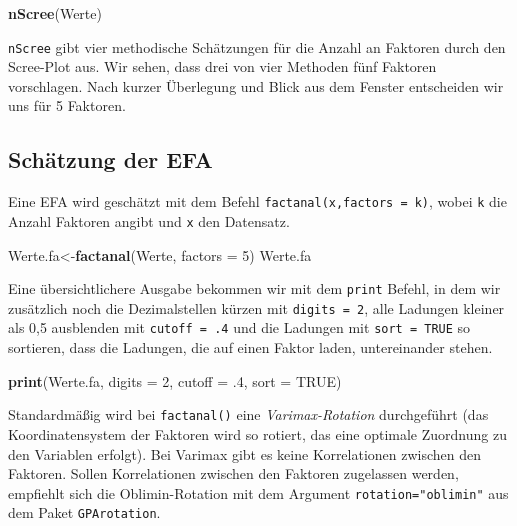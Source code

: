 \documentclass[12pt,ngerman,]{book}
\makeatletter
\newenvironment{Shaded}{\begin{snugshade}}{\end{snugshade}}
\newcommand{\KeywordTok}[1]{\textcolor[rgb]{0.13,0.29,0.53}{\textbf{#1}}}
\newcommand{\DataTypeTok}[1]{\textcolor[rgb]{0.13,0.29,0.53}{#1}}
\newcommand{\DecValTok}[1]{\textcolor[rgb]{0.00,0.00,0.81}{#1}}
\newcommand{\OtherTok}[1]{\textcolor[rgb]{0.56,0.35,0.01}{#1}}
\newcommand{\NormalTok}[1]{#1}
\newenvironment{kframe}{%
\medskip{}
\setlength{\fboxsep}{.8em}
 \def\at@end@of@kframe{}%
 \ifinner\ifhmode%
  \def\at@end@of@kframe{\end{minipage}}%
  \begin{minipage}{\columnwidth}%
 \fi\fi%
 \def\FrameCommand##1{\hskip\@totalleftmargin \hskip-\fboxsep
 \colorbox{shadecolor}{##1}\hskip-\fboxsep
     \hskip-\linewidth \hskip-\@totalleftmargin \hskip\columnwidth}%
 \MakeFramed {\advance\hsize-\width
   \@totalleftmargin\z@ \linewidth\hsize
   \@setminipage}}%
 {\par\unskip\endMakeFramed%
 \at@end@of@kframe}
\renewenvironment{Shaded}{\begin{kframe}}{\end{kframe}}
\theoremstyle{definition}
\theoremstyle{definition}
\theoremstyle{remark}
\makeatother
\begin{document}
\begin{Shaded}
\begin{Highlighting}[]
\KeywordTok{nScree}\NormalTok{(Werte)}
\end{Highlighting}
\end{Shaded}

\texttt{nScree} gibt vier methodische Schätzungen für die Anzahl an
Faktoren durch den Scree-Plot aus. Wir sehen, dass drei von vier
Methoden fünf Faktoren vorschlagen. Nach kurzer Überlegung und Blick aus
dem Fenster entscheiden wir uns für 5 Faktoren.

\subsection{Schätzung der EFA}\label{schatzung-der-efa}

Eine EFA wird geschätzt mit dem Befehl
\texttt{factanal(x,factors\ =\ k)}, wobei \texttt{k} die Anzahl Faktoren
angibt und \texttt{x} den Datensatz.

\begin{Shaded}
\begin{Highlighting}[]
\NormalTok{Werte.fa<-}\KeywordTok{factanal}\NormalTok{(Werte, }\DataTypeTok{factors =} \DecValTok{5}\NormalTok{)}
\NormalTok{Werte.fa}
\end{Highlighting}
\end{Shaded}

Eine übersichtlichere Ausgabe bekommen wir mit dem \texttt{print}
Befehl, in dem wir zusätzlich noch die Dezimalstellen kürzen mit
\texttt{digits\ =\ 2}, alle Ladungen kleiner als 0,5 ausblenden mit
\texttt{cutoff\ =\ .4} und die Ladungen mit \texttt{sort\ =\ TRUE} so
sortieren, dass die Ladungen, die auf einen Faktor laden, untereinander
stehen.

\begin{Shaded}
\begin{Highlighting}[]
\KeywordTok{print}\NormalTok{(Werte.fa, }\DataTypeTok{digits =} \DecValTok{2}\NormalTok{, }\DataTypeTok{cutoff =}\NormalTok{ .}\DecValTok{4}\NormalTok{, }\DataTypeTok{sort =} \OtherTok{TRUE}\NormalTok{)}
\end{Highlighting}
\end{Shaded}

Standardmäßig wird bei \texttt{factanal()} eine \emph{Varimax-Rotation}
durchgeführt (das Koordinatensystem der Faktoren wird so rotiert, das
eine optimale Zuordnung zu den Variablen erfolgt). Bei Varimax gibt es
keine Korrelationen zwischen den Faktoren. Sollen Korrelationen zwischen
den Faktoren zugelassen werden, empfiehlt sich die Oblimin-Rotation mit
dem Argument \texttt{rotation="oblimin"} aus dem Paket
\texttt{GPArotation}.
\end{document}

